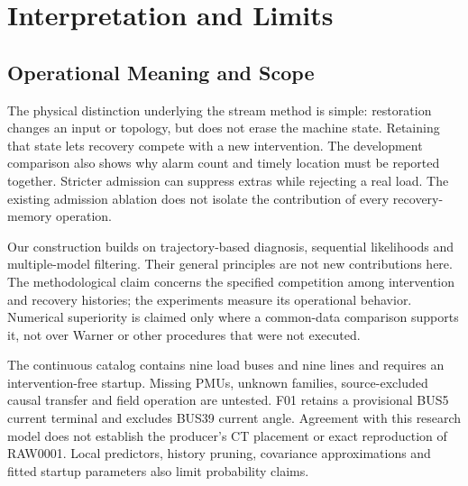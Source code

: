 \section{Interpretation and Limits}
\label{sec:discussion}



\subsection{Operational Meaning and Scope}
The physical distinction underlying the stream method is simple:
restoration changes an input or topology, but does not erase the machine
state. Retaining that state lets recovery compete with a new intervention.
The development comparison also shows why alarm count and timely location
must be reported together. Stricter admission can suppress extras while
rejecting a real load. The existing admission ablation does not isolate
the contribution of every recovery-memory operation.


Our construction builds on trajectory-based diagnosis, sequential
likelihoods and multiple-model filtering. Their general principles are not
new contributions here. The methodological claim concerns the specified
competition among intervention and recovery histories; the experiments
measure its operational behavior. Numerical superiority is claimed only
where a common-data comparison supports it, not over Warner or other
procedures that were not executed.

The continuous catalog contains nine load buses and nine lines and requires
an intervention-free startup. Missing PMUs, unknown families, source-excluded
causal transfer and field operation are untested. F01 retains a provisional
BUS5 current terminal and excludes BUS39 current angle. Agreement with
this research model does not establish the producer's CT placement or
exact reproduction of RAW0001. Local predictors, history pruning, covariance
approximations and fitted startup parameters also limit probability claims.

